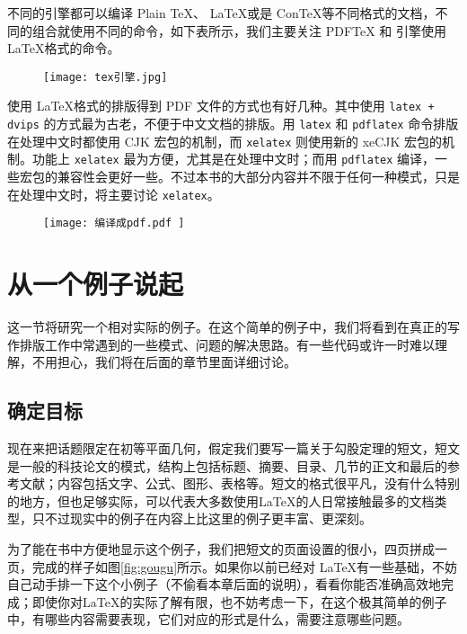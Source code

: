 {    \qquad 不同的引擎都可以编译 Plain \TeX 、 \LaTeX 或是 Con\TeX 等不同格式的文档，不同的组合就使用不同的命令，如下表所示，我们主要关注 PDFTeX 和 \XeTeX 引擎使用 \LaTeX 格式的命令。

    \begin{figure}[H]
        \centering
        \texttt{[image: tex引擎.jpg]}
    \end{figure}

    \qquad 使用 \LaTeX 格式的排版得到 PDF 文件的方式也有好几种。其中使用 \lstinline{latex + dvips} 的方式最为古老，不便于中文文档的排版。用 \lstinline{latex} 和 \lstinline{pdflatex} 命令排版在处理中文时都使用 CJK 宏包的机制，而 \lstinline{xelatex} 则使用新的 xeCJK 宏包的机制。功能上 \lstinline{xelatex} 最为方便，尤其是在处理中文时；而用 \lstinline{pdflatex} 编译，一些宏包的兼容性会更好一些。不过本书的大部分内容并不限于任何一种模式，只是在处理中文时，将主要讨论 \lstinline{xelatex}。

    \begin{figure}[H]
        \centering
        \texttt{[image: 编译成pdf.pdf ]}
    \end{figure}
}

\section{从一个例子说起}

这一节将研究一个相对实际的例子。在这个简单的例子中，我们将看到在真正的写作排版工作中常遇到的一些模式、问题的解决思路。有一些代码或许一时难以理解，不用担心，我们将在后面的章节里面详细讨论。

\subsection{确定目标}

现在来把话题限定在初等平面几何，假定我们要写一篇关于勾股定理的短文，短文是一般的科技论文的模式，结构上包括标题、摘要、目录、几节的正文和最后的参考文献；内容包括文字、公式、图形、表格等。短文的格式很平凡，没有什么特别的地方，但也足够实际，可以代表大多数使用\LaTeX 的人日常接触最多的文档类型，只不过现实中的例子在内容上比这里的例子更丰富、更深刻。

为了能在书中方便地显示这个例子，我们把短文的页面设置的很小，四页拼成一页，完成的样子如图\ref{fig:gougu}所示。如果你以前已经对 \LaTeX 有一些基础，不妨自己动手排一下这个小例子（不偷看本章后面的说明），看看你能否准确高效地完成；即使你对\LaTeX 的实际了解有限，也不妨考虑一下，在这个极其简单的例子中，有哪些内容需要表现，它们对应的形式是什么，需要注意哪些问题。

